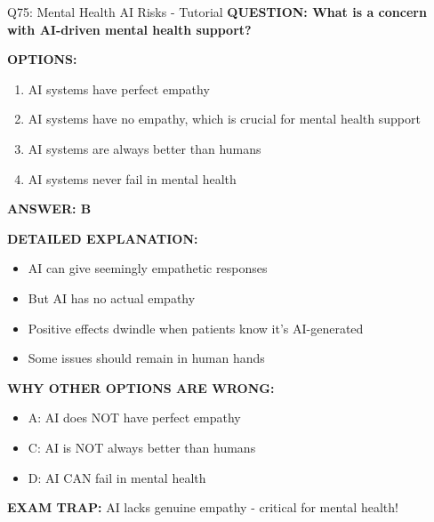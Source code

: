 \documentclass[8pt]{beamer}
\begin{document}
	\begin{frame}{Q75: Mental Health AI Risks - Tutorial}
		\fontsize{6.5}{7.5}\selectfont
		\textbf{QUESTION: What is a concern with AI-driven mental health support?}
		
		\vspace{0.1cm}
		\textbf{OPTIONS:}
		\begin{enumerate}
			\item AI systems have perfect empathy
			\item AI systems have no empathy, which is crucial for mental health support
			\item AI systems are always better than humans
			\item AI systems never fail in mental health
		\end{enumerate}
		
		\vspace{0.1cm}
		\textcolor{myblue}{\textbf{ANSWER: B}}
		
		\vspace{0.1cm}
		\textbf{DETAILED EXPLANATION:}
		\begin{itemize}
			\item AI can give seemingly empathetic responses
			\item But AI has no actual empathy
			\item Positive effects dwindle when patients know it's AI-generated
			\item Some issues should remain in human hands
		\end{itemize}
		
		\vspace{0.1cm}
		\textcolor{myred}{\textbf{WHY OTHER OPTIONS ARE WRONG:}}
		\begin{itemize}
			\item \textcolor{myred}{A:} AI does NOT have perfect empathy
			\item \textcolor{myred}{C:} AI is NOT always better than humans
			\item \textcolor{myred}{D:} AI CAN fail in mental health
		\end{itemize}
		
		\textcolor{myred}{\textbf{EXAM TRAP:}} AI lacks \textcolor{myblue}{genuine empathy} - critical for mental health!
	\end{frame}
	
	
\end{document}

